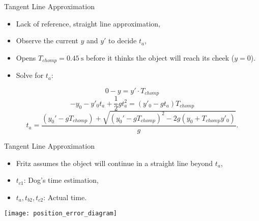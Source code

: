\documentclass[compress,12pt,mp]{beamer}
\begin{document}
\begin{frame}[t]{Tangent Line Approximation}
\begin{itemize}
\item Lack of reference, straight line approximation,
\item Observe the current $y$ and $y'$ to decide $t_a$,
\item Opens \(T_{chomp}=\SI{0.45}{\s}\) before it thinks the object will reach its cheek ($y=0$).


\item Solve for \(t_a\):
\end{itemize}
$$0-y=y'\cdot T_{chomp}$$  %
$$-y_0-y'_0t_{a}+\frac{1}{2}gt_{a}^2=(y'_0-gt_{a})T_{chomp}$$   %
$$t_{a}=\frac{(y_0'-gT_{chomp})+\sqrt{(y_0'-gT_{chomp})^2-2g(y_0+T_{chomp}y'_0)}}{g}.$$
\end{frame}
\begin{frame}[t]{Tangent Line Approximation}
\begin{itemize}

\item Fritz assumes the object will continue in a straight line beyond $t_a$,

\item $t_{c1}$: Dog's time estimation,

\item $t_{a}, t_{b2}, t_{c2}$: Actual time.
\end{itemize}
\begin{center}
\texttt{[image: position\_error\_diagram]}
\end{center}
\end{frame}
\end{document}
